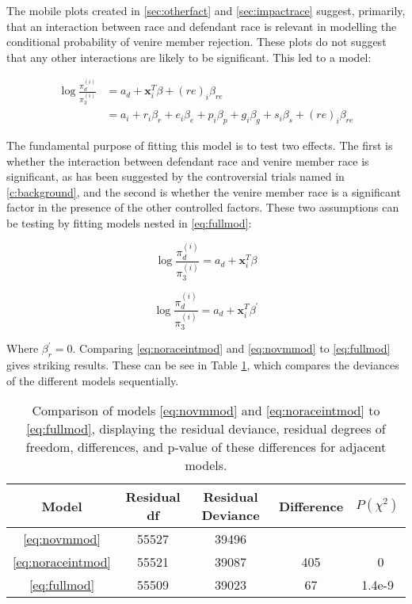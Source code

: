 The mobile plots created in \ref{sec:otherfact} and \ref{sec:impactrace} suggest, primarily, that an interaction between race and
defendant race is relevant in modelling the conditional probability of venire member rejection. These plots do not suggest that
any other interactions are likely to be significant. This led to a model:

\begin{equation}
  \label{eq:fullmod}
  \begin{split}
    \log \frac{\pi_d^{(i)}}{\pi_3^{(i)}} & = a_d + \mathbf{x}_i^T \beta + (re)_i \beta_{re} \\
    & = a_i + r_i \beta_r + e_i \beta_e + p_i \beta_p + g_i \beta_g + s_i \beta_s + (re)_i \beta_{re}
  \end{split}
\end{equation}

The fundamental purpose of fitting this model is to test two effects. The first is whether the interaction between defendant race
and venire member race is significant, as has been suggested by the controversial trials named in \ref{c:background}, and the
second is whether the venire member race is a significant factor in the presence of the other controlled factors. These two
assumptions can be testing by fitting models nested in \ref{eq:fullmod}:

\begin{equation}
  \label{eq:noraceintmod}
  \log \frac{\pi_d^{(i)}}{\pi_3^{(i)}} = a_d + \mathbf{x}_i^T \beta
\end{equation}

\begin{equation}
  \label{eq:novmmod}
  \log \frac{\pi_d^{(i)}}{\pi_3^{(i)}} = a_d + \mathbf{x}_i^T \beta^{\prime}
\end{equation}

Where $\beta^{\prime}_r = 0$. Comparing \ref{eq:noraceintmod} and \ref{eq:novmmod} to \ref{eq:fullmod} gives striking
results. These can be see in Table \ref{tab:modcomp}, which compares the deviances of the different models sequentially.

\begin{table}[h!]
  \centering
  \caption[Model Comparisons to Determine the Importance of
  Race]{\footnotesize Comparison of models \ref{eq:novmmod} and \ref{eq:noraceintmod}
    to \ref{eq:fullmod}, displaying the residual deviance, residual degrees of freedom, differences, and p-value of these
    differences for adjacent models.}
  \label{tab:modcomp}
  \begin{tabular}{|c|c|c|c|c|} \hline
    Model & Residual df & Residual Deviance & Difference & $P(\chi^2)$ \\ \hline
    \ref{eq:novmmod} & 55527 & 39496 &  &  \\
    \ref{eq:noraceintmod} & 55521 & 39087 & 405 & ~0 \\
    \ref{eq:fullmod} & 55509 & 39023 & 67 & 1.4e-9 \\ \hline
  \end{tabular}
\end{table}


